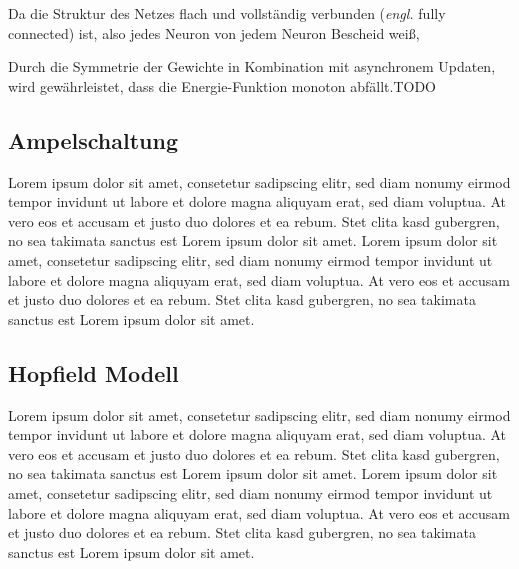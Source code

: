 Da die Struktur des Netzes flach und vollständig verbunden (\textit{engl.} fully connected) ist, also jedes Neuron von jedem Neuron Bescheid weiß, 

Durch die Symmetrie der Gewichte in Kombination mit asynchronem Updaten, wird gewährleistet, dass die Energie-Funktion monoton abfällt.TODO


\subsection*{Ampelschaltung}
Lorem ipsum dolor sit amet, consetetur sadipscing elitr, sed diam nonumy eirmod tempor invidunt ut labore et dolore magna aliquyam erat, sed diam voluptua. At vero eos et accusam et justo duo dolores et ea rebum. Stet clita kasd gubergren, no sea takimata sanctus est Lorem ipsum dolor sit amet. Lorem ipsum dolor sit amet, consetetur sadipscing elitr, sed diam nonumy eirmod tempor invidunt ut labore et dolore magna aliquyam erat, sed diam voluptua. At vero eos et accusam et justo duo dolores et ea rebum. Stet clita kasd gubergren, no sea takimata sanctus est Lorem ipsum dolor sit amet.

\subsection*{Hopfield Modell}
Lorem ipsum dolor sit amet, consetetur sadipscing elitr, sed diam nonumy eirmod tempor invidunt ut labore et dolore magna aliquyam erat, sed diam voluptua. At vero eos et accusam et justo duo dolores et ea rebum. Stet clita kasd gubergren, no sea takimata sanctus est Lorem ipsum dolor sit amet. Lorem ipsum dolor sit amet, consetetur sadipscing elitr, sed diam nonumy eirmod tempor invidunt ut labore et dolore magna aliquyam erat, sed diam voluptua. At vero eos et accusam et justo duo dolores et ea rebum. Stet clita kasd gubergren, no sea takimata sanctus est Lorem ipsum dolor sit amet.